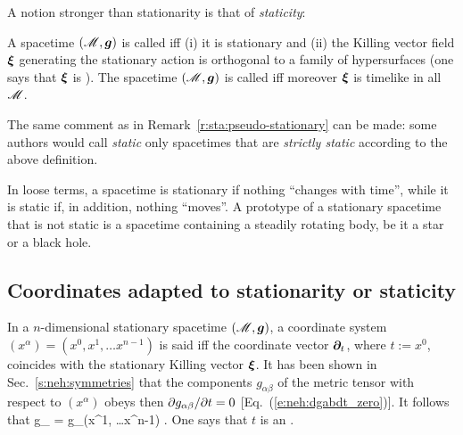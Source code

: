 A notion stronger than stationarity is that of \emph{staticity}:

\begin{greybox}
A spacetime $(\mathscr{M},\bm{g})$ is called 
iff (i) it is stationary and (ii) the Killing vector field $\bm{\xi}$
generating the stationary action is orthogonal to a family of hypersurfaces
(one says that $\bm{\xi}$ is ).
The spacetime $(\mathscr{M},\bm{g})$ is called 
iff moreover $\bm{\xi}$ is timelike in all $\mathscr{M}$.
\end{greybox}

\begin{remark}
The same comment as in Remark~\ref{r:sta:pseudo-stationary} can be made: some authors
would call \emph{static} only spacetimes that are
\emph{strictly static} according to the above definition.
\end{remark}

In loose terms, a spacetime is stationary if nothing ``changes with time'', while
it is static if, in addition, nothing ``moves''. A prototype of a stationary
spacetime that is not static is a spacetime containing a steadily rotating
body, be it a star or a black hole.


\subsection{Coordinates adapted to stationarity or staticity}

In a $n$-dimensional stationary spacetime $(\mathscr{M},\bm{g})$, a coordinate system $(x^\alpha) = (x^0, x^1, \ldots  x^{n-1})$
is said  iff the coordinate vector
$\bm{\partial}_t$, where $t := x^0$, coincides with the stationary Killing vector $\bm{\xi}$.
It has been shown in Sec.~\ref{s:neh:symmetries} that the components $g_{\alpha\beta}$
of the metric tensor with respect to $(x^\alpha)$ obeys then ${\partial g_{\alpha\beta}}/{\partial t} = 0$
[Eq.~(\ref{e:neh:dgabdt_zero})]. It follows that
\be
   g_{\alpha\beta}  = g_{\alpha\beta}(x^1, \ldots  x^{n-1}) .
\ee
One says that $t$ is an .

